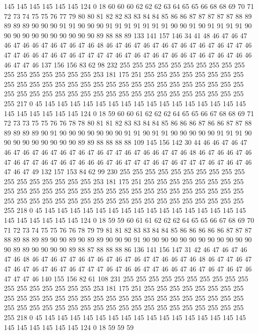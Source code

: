 145 145 145 145 145 145 124 0 18 60 60 60 62 62 62 63 64 65 65 66
68 68 69 70 71 72 73 74 75 75 76 77 79 80 80 81 82 82 83 83
84 84 85 86 86 87 87 87 87 87 88 89 89 89 89 90 90 90 91 91
90 90 90 91 91 91 91 91 91 91 90 90 91 90 91 91 91 91 90 90
90 90 90 90 90 90 90 90 90 89 88 88 89 133 141 157 146 34 41 48
46 47 46 47 46 47 46 46 47 46 47 46 47 46 48 46 47 46 47 46
47 46 47 46 47 46 47 46 47 47 46 47 47 46 46 47 46 47 46 47
47 47 47 46 47 46 47 46 47 46 46 47 46 47 46 47 46 46 46 47
47 46 137 156 156 83 62 98 232 255 255 255 255 255 255 255 255 255 255 255
255 255 255 255 255 255 253 181 175 251 255 255 255 255 255 255 255 255 255 255
255 255 255 255 255 255 255 255 255 255 255 255 255 255 255 255 255 255 255 255
255 255 255 255 255 255 255 255 255 255 255 255 255 255 255 255 255 217 0 45
145 145 145 145 145 145 145 145 145 145 145 145 145 145 145 145 145 145 145 145
145 145 124 0 18 59 60 60 61 62 62 62 64 65 65 66 67 68 68 69
71 72 73 73 75 75 76 76 78 78 80 81 81 82 83 83 84 84 85 86
86 86 87 86 86 87 87 88 89 89 89 89 90 91 90 90 90 90 90 90
90 91 91 90 91 91 90 90 90 90 90 91 91 91 90 90 90 90 90 90
90 90 90 89 89 88 88 88 88 109 145 156 142 30 44 46 46 47 46 47
46 47 46 47 46 47 46 47 46 47 46 47 47 46 47 46 46 47 47 46
48 46 47 46 46 47 46 47 46 47 47 46 47 46 47 46 46 46 47 46
47 47 47 46 47 46 47 47 47 46 47 46 47 46 47 46 47 49 132 157
153 84 62 99 230 255 255 255 255 255 255 255 255 255 255 255 255 255 255 255
255 255 253 181 175 251 255 255 255 255 255 255 255 255 255 255 255 255 255 255
255 255 255 255 255 255 255 255 255 255 255 255 255 255 255 255 255 255 255 255
255 255 255 255 255 255 255 255 255 255 255 255 255 218 0 45 145 145 145 145
145 145 145 145 145 145 145 145 145 145 145 145 145 145 145 145 145 145 124 0
18 59 59 60 61 61 62 62 62 64 65 65 66 67 68 69 70 71 72 73
74 75 75 76 76 78 79 79 81 81 82 83 83 84 84 85 86 86 86 86
86 87 87 87 88 89 88 89 89 90 90 89 90 89 89 90 90 90 91 90
90 90 90 90 90 90 90 90 90 90 90 90 89 89 90 90 90 90 89 88
87 88 88 88 86 136 141 156 147 31 42 46 47 46 47 46 47 46 48 46
47 46 47 47 46 47 46 47 46 47 46 47 47 46 46 47 46 48 46 47
47 46 47 47 46 47 46 47 46 47 46 47 47 47 46 47 46 46 47 47
46 46 47 46 47 46 47 46 47 46 47 47 47 46 140 155 156 82 61 108
231 255 255 255 255 255 255 255 255 255 255 255 255 255 255 255 255 255 253 181
175 251 255 255 255 255 255 255 255 255 255 255 255 255 255 255 255 255 255 255
255 255 255 255 255 255 255 255 255 255 255 255 255 255 255 255 255 255 255 255
255 255 255 255 255 255 255 255 255 218 0 45 145 145 145 145 145 145 145 145
145 145 145 145 145 145 145 145 145 145 145 145 145 145 124 0 18 59 59 59
